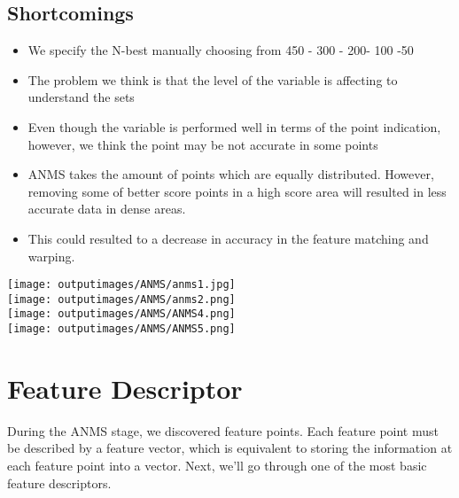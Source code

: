 \documentclass{CUP-JNL-PPS}
\begin{document}
\subsection{Shortcomings}
\begin{itemize}
    \item We specify the N-best manually choosing from 450 - 300 - 200- 100 -50
    \item The problem we think is that the level of the variable is affecting to understand the sets
    \item Even though the variable is performed well in terms of the point indication, however, we think the point may be not accurate in some points
    \item ANMS takes the amount of points which are equally distributed. However, removing some of better score points in a high score area will resulted in less accurate data in dense areas. 
    \item This could resulted to a decrease in accuracy in the feature matching and warping.
\end{itemize}



\begin{center}
\texttt{[image: outputimages/ANMS/anms1.jpg]}\\
\texttt{[image: outputimages/ANMS/anms2.png]}\\
\texttt{[image: outputimages/ANMS/ANMS4.png]}\\
\texttt{[image: outputimages/ANMS/ANMS5.png]}
\end{center}

\section[]{Feature Descriptor}
During the ANMS stage, we discovered feature points. Each feature point must be described by a feature vector, which is equivalent to storing the information at each feature point into a vector. Next, we'll go through one of the most basic feature descriptors.
\end{document}

